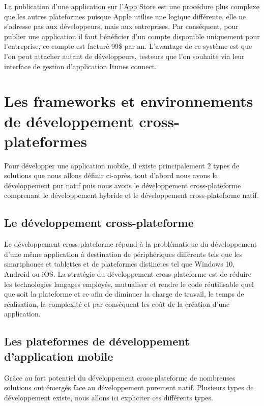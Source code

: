 \documentclass[11]{article}
\begin{document}
 \vspace{0.5cm}
 
La publication d’une application sur l’App Store est une procédure plus complexe que les autres plateformes puisque Apple utilise une logique différente, elle ne s’adresse pas aux développeurs, mais aux entreprises. Par conséquent, pour publier une application il faut bénéficier d’un compte disponible uniquement pour l’entreprise, ce compte est facturé 99\$ par an. L’avantage de ce système est que l’on peut attacher autant de développeurs, testeurs que l’on souhaite via leur interface de gestion d’application Itunes connect.


\section{Les frameworks et environnements de développement cross-plateformes}
Pour développer une application mobile, il existe principalement 2 types de solutions que nous allons définir ci-après, tout d’abord nous avons le développement pur natif puis nous avons le développement cross-plateforme comprenant le développement hybride et le développement cross-plateforme natif.

\subsection{Le développement cross-plateforme}
Le développement cross-plateforme répond à la problématique du développement d’une même application à destination de périphériques différents tels que les smartphones et tablettes et de plateformes distinctes tel que Windows 10, Android ou iOS. La stratégie du développement cross-plateforme est de réduire les technologies langages employés, mutualiser et rendre le code réutilisable quel que soit la plateforme et ce afin de diminuer la charge de travail, le temps de réalisation, la complexité et par conséquent les coût de la création d’une application. 

\subsection{Les plateformes de développement d’application mobile}
Grâce au fort potentiel du développement cross-plateforme de nombreuses solutions ont émergés face au développement purement natif. Plusieurs types de développement existe, nous allons ici expliciter ces différents types.
\end{document}
